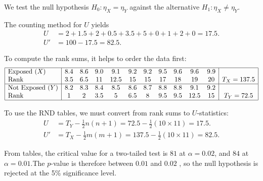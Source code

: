 \begin{solution}
We test the null hypothesis $H_0:\eta_X=\eta_Y$ against the alternative $H_1:\eta_X\neq\eta_Y$.

The counting method for $U$ yields
\begin{align*}
U  & = 2 + 1.5 + 2 + 0.5 + 3.5 + 5 + 0 + 1 + 2 + 0 = 17.5. \\
U' & = 100-17.5 = 82.5.
\end{align*}

To compute the rank sums, it helps to order the data first:
\[\begin{array}{|l|cccccccccc|c|}\hline
\text{Exposed } (X)		& 8.4   	& 8.6	& 9.0	& 9.1	& 9.2	& 9.2	& 9.5	& 9.6	& 9.6	& 9.9	& 	\\
\text{Rank} 				& 3.5	& 6.5  	& 11  	& 12.5  	& 15   	& 15		& 17		& 18		& 19   	& 20		& T_X = 137.5 \\ \hline
\text{Not Exposed } (Y)	& 8.2   	& 8.3   & 8.4  	& 8.5 	& 8.6	& 8.7	& 8.8	& 8.8	& 9.1	& 9.2 	& \\ 
\text{Rank} 				& 1		& 2		& 3.5	& 5		& 6.5	& 8		& 9.5	& 9.5	& 12.5	& 15 	& T_Y = 72.5 \\ \hline
\end{array}\]

To use the RND tables, we must convert from rank sums to $U$-statistics:
\begin{align*}
U  		& =  T_Y - \frac{1}{2}n(n + 1) =  72.5 - \frac{1}{2}(10\times 11) = 17.5. \\
U' 		& =  T_X - \frac{1}{2}m(m + 1) = 137.5 - \frac{1}{2}(10\times 11) =  82.5.
\end{align*}

From tables, the critical value for a two-tailed test is $81$ at $\alpha=0.02$, and $84$ at $\alpha=0.01$.The $p$-value is therefore between $0.01$ and $0.02$ , so the null hypothesis is rejected at the 5\% significance level.
\end{solution}


